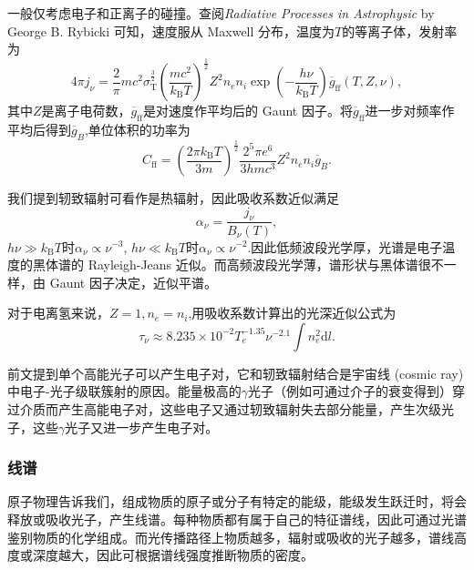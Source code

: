 \documentclass[../天体物理基础.tex]{subfiles}
\begin{document}
一般仅考虑电子和正离子的碰撞。查阅\textit{Radiative Processes in Astrophysic} by George B. Rybicki 可知，速度服从 Maxwell 分布，温度为$T$的等离子体，发射率为
\begin{equation}
4\pi j_{\nu}=\frac{2}{\pi}mc^{2}\sigma_{\text{T}}^{\frac{3}{2}}\left(\frac{mc^{2}}{k_{\text{B}}T}\right)^{\frac{1}{2}}Z^{2}n_{e}n_{i}\exp\left(-\frac{h\nu}{k_{\text{B}}T}\right)\overline{g}_{\text{ff}}\left(T,Z,\nu\right),
\end{equation}
其中$Z$是离子电荷数，$\overline{g}_{\text{ff}}$是对速度作平均后的 Gaunt 因子。将$\overline{g}_{\text{ff}}$进一步对频率作平均后得到$\overline{g}_{B}$,单位体积的功率为
\begin{equation}
C_{\text{ff}}=\left(\frac{2\pi k_{\text{B}}T}{3m}\right)^{\frac{1}{2}}\frac{2^{5}\pi e^{6}}{3hmc^{3}}Z^{2}n_{e}n_{i}\overline{g}_{B}.
\end{equation}

我们提到轫致辐射可看作是热辐射，因此吸收系数近似满足
\begin{equation}
\alpha_{\nu}=\frac{j_{\nu}}{B_{\nu}\left(T\right)},
\end{equation}
$h\nu\gg k_{\text{B}}T$时$\alpha_{\nu}\propto{}\nu^{-3}$, $h\nu\ll k_{\text{B}}T$时$\alpha_{\nu}\propto{}\nu^{-2}$.因此低频波段光学厚，光谱是电子温度的黑体谱的 Rayleigh-Jeans 近似。而高频波段光学薄，谱形状与黑体谱很不一样，由 Gaunt 因子决定，近似平谱。

对于电离氢来说，$Z=1,n_{e}=n_{i}$,用吸收系数计算出的光深近似公式为
\begin{equation}
\tau_{\nu}\approx8.235\times10^{-2}T_{e}^{-1.35}\nu^{-2.1}\int n_{e}^{2}\mathrm{d}l.
\end{equation}

前文提到单个高能光子可以产生电子对，它和轫致辐射结合是宇宙线 (cosmic ray) 中电⼦{}-{}光⼦级联簇射的原因。能量极⾼的$\gamma$光⼦（例如可通过介⼦的衰变得到）穿过介质⽽产生⾼能电⼦对，这些电子又通过轫致辐射失去部分能量，产⽣次级光⼦，这些$\gamma$光⼦又进一步产⽣电⼦对。

\subsubsection{线谱}
原子物理告诉我们，组成物质的原子或分子有特定的能级，能级发生跃迁时，将会释放或吸收光子，产生线谱。每种物质都有属于自己的特征谱线，因此可通过光谱鉴别物质的化学组成。而光传播路径上物质越多，辐射或吸收的光子越多，谱线高度或深度越大，因此可根据谱线强度推断物质的密度。
\end{document}
